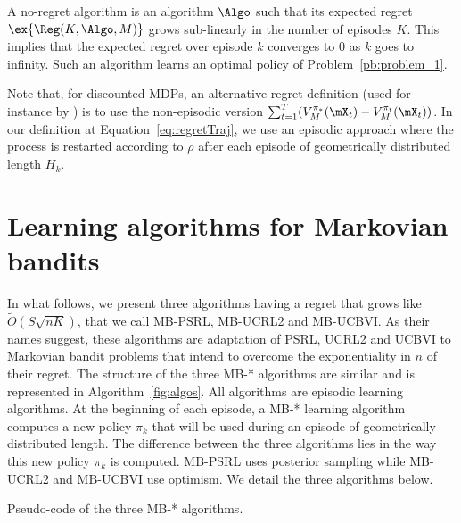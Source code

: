 A no-regret algorithm is an algorithm $\Algo$ such that its expected regret $\ex{\Reg(K,\Algo,M)}$ grows sub-linearly in the number of episodes $K$. This implies that the expected regret over episode $k$  converges to $0$ as $k$ goes to infinity. Such an algorithm learns an optimal policy of Problem~\ref{pb:problem_1}.

Note that, for discounted MDPs, an alternative regret definition (used for instance by \cite{zhou2021nearly}) is to use the non-episodic version $\sum_{t=1}^T (V^{\pi_*}_M(\mX_{t}) - V^{\pi_t}_M(\mX_{t}))$. In our definition at Equation~\eqref{eq:regretTraj}, we use an episodic approach where the process is restarted according to $\rho$ after each episode of geometrically distributed length $H_k$.

\section{Learning algorithms for Markovian bandits}
\label{sec:learning_algorithms}

In what follows, we present three algorithms having a regret that grows like $\tilde{O}(S\sqrt{nK})$, that we call MB-PSRL, MB-UCRL2 and MB-UCBVI. As their names suggest, these algorithms are adaptation of PSRL, UCRL2 and UCBVI to Markovian bandit problems that intend to overcome the exponentiality in $n$ of their regret. The structure of the three MB-* algorithms are similar and is represented in Algorithm~\ref{fig:algos}. All algorithms are episodic learning algorithms. At the beginning of each episode, a MB-* learning algorithm computes a new policy $\pi_k$ that will be used during an episode of geometrically distributed length. The difference between the three algorithms lies in the way this new policy $\pi_k$ is computed. MB-PSRL uses posterior sampling while MB-UCRL2 and MB-UCBVI use optimism. We detail the three algorithms below. 

\begin{algorithm}[ht]
    \BlankLine
    \caption{Pseudo-code of the three MB-* algorithms.}
    \label{fig:algos}
\end{algorithm}

